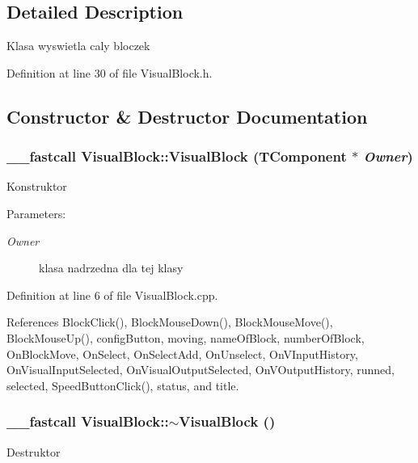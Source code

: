 \subsection{Detailed Description}
Klasa wyswietla caly bloczek 

Definition at line 30 of file VisualBlock.h.

\subsection{Constructor \& Destructor Documentation}
\hypertarget{classVisualBlock_19ba01bbc2f90d861528bf705b93aa05}{
\subsubsection[VisualBlock]{\setlength{\rightskip}{0pt plus 5cm}\_\-\_\-fastcall VisualBlock::VisualBlock (TComponent $\ast$ {\em Owner})}}
\label{classVisualBlock_19ba01bbc2f90d861528bf705b93aa05}


Konstruktor \begin{Desc}
\item[Parameters:]
\begin{description}
\item[{\em Owner}]klasa nadrzedna dla tej klasy \end{description}
\end{Desc}


Definition at line 6 of file VisualBlock.cpp.

References BlockClick(), BlockMouseDown(), BlockMouseMove(), BlockMouseUp(), configButton, moving, nameOfBlock, numberOfBlock, OnBlockMove, OnSelect, OnSelectAdd, OnUnselect, OnVInputHistory, OnVisualInputSelected, OnVisualOutputSelected, OnVOutputHistory, runned, selected, SpeedButtonClick(), status, and title.\hypertarget{classVisualBlock_88dac1befb8f8aa9d3435c8c35d1ffee}{
\subsubsection[$\sim$VisualBlock]{\setlength{\rightskip}{0pt plus 5cm}\_\-\_\-fastcall VisualBlock::$\sim$VisualBlock ()}}
\label{classVisualBlock_88dac1befb8f8aa9d3435c8c35d1ffee}


Destruktor 


